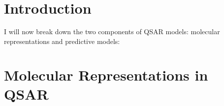 \section{Introduction}


I will now break down the two components of QSAR models: molecular representations and predictive models:


\section{Molecular Representations in QSAR}

